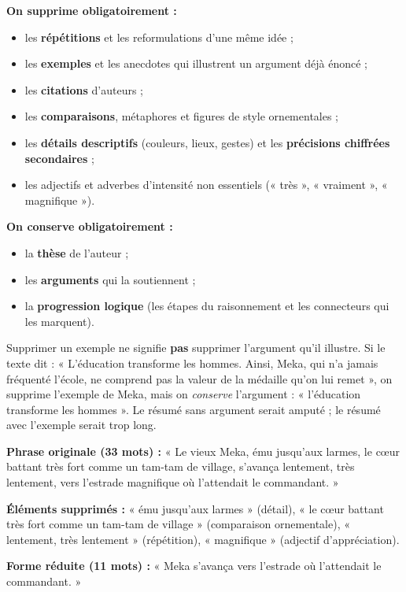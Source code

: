 \documentclass[11pt]{article}
\begin{document}
\begin{propriete}
\textbf{On supprime obligatoirement :}
\begin{itemize}
\item les \textbf{répétitions} et les reformulations d'une même idée ;
\item les \textbf{exemples} et les anecdotes qui illustrent un argument déjà énoncé ;
\item les \textbf{citations} d'auteurs ;
\item les \textbf{comparaisons}, métaphores et figures de style ornementales ;
\item les \textbf{détails descriptifs} (couleurs, lieux, gestes) et les \textbf{précisions chiffrées secondaires} ;
\item les adjectifs et adverbes d'intensité non essentiels (« très », « vraiment », « magnifique »).
\end{itemize}
\textbf{On conserve obligatoirement :}
\begin{itemize}
\item la \textbf{thèse} de l'auteur ;
\item les \textbf{arguments} qui la soutiennent ;
\item la \textbf{progression logique} (les étapes du raisonnement et les connecteurs qui les marquent).
\end{itemize}
\end{propriete}

\begin{attention}
Supprimer un exemple ne signifie \textbf{pas} supprimer l'argument qu'il illustre. Si le texte dit : « L'éducation transforme les hommes. Ainsi, Meka, qui n'a jamais fréquenté l'école, ne comprend pas la valeur de la médaille qu'on lui remet », on supprime l'exemple de Meka, mais on \emph{conserve} l'argument : « l'éducation transforme les hommes ». Le résumé sans argument serait amputé ; le résumé avec l'exemple serait trop long.
\end{attention}

\begin{exemplebox}
\textbf{Phrase originale (33 mots) :} « Le vieux Meka, ému jusqu'aux larmes, le cœur battant très fort comme un tam-tam de village, s'avança lentement, très lentement, vers l'estrade magnifique où l'attendait le commandant. »

\textbf{Éléments supprimés :} « ému jusqu'aux larmes » (détail), « le cœur battant très fort comme un tam-tam de village » (comparaison ornementale), « lentement, très lentement » (répétition), « magnifique » (adjectif d'appréciation).

\textbf{Forme réduite (11 mots) :} « Meka s'avança vers l'estrade où l'attendait le commandant. »
\end{exemplebox}
\end{document}
